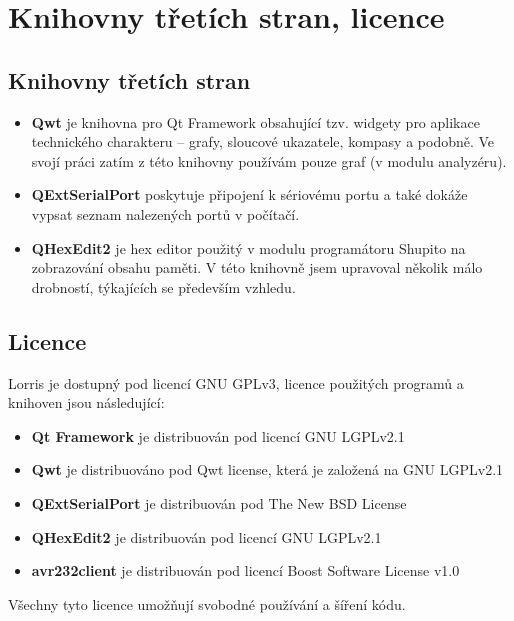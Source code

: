 \documentclass[12pt, a4paper, oneside]{article}
\begin{document}
\newpage
\section{Knihovny třetích stran, licence}
\subsection{Knihovny třetích stran}
\begin{itemize}
    \item {\bf Qwt}\cite{qwt} je knihovna pro Qt Framework obsahující tzv. widgety pro aplikace technického charakteru -- grafy, sloucové ukazatele, kompasy a podobně. Ve svojí práci zatím z této knihovny používám pouze graf (v modulu analyzéru).
    \item {\bf QExtSerialPort}\cite{qext} poskytuje připojení k sériovému portu a také dokáže vypsat seznam nalezených portů v počítačí.
    \item {\bf QHexEdit2}\cite{qhex} je hex editor použitý v modulu programátoru Shupito na zobrazování obsahu paměti. V této knihovně jsem upravoval několik málo drobností, týkajících se především vzhledu.
\end{itemize}

\subsection{Licence}
Lorris je dostupný pod licencí GNU GPLv3\cite{gpl3}, licence použitých programů a knihoven jsou následující:
\begin{itemize}
    \item {\bf Qt Framework} je distribuován pod licencí GNU LGPLv2.1\cite{lgpl}
    \item {\bf Qwt} je distribuováno pod Qwt license\cite{qwtlicense}, která je založená na GNU LGPLv2.1
    \item {\bf QExtSerialPort} je distribuován pod The New BSD License\cite{newbsd}
    \item {\bf QHexEdit2} je distribuován pod licencí GNU LGPLv2.1
    \item {\bf avr232client} je distribuován pod licencí Boost Software License v1.0\cite{boost}
\end{itemize}

Všechny tyto licence umožňují svobodné používání a šíření kódu.
\newpage
\end{document}
